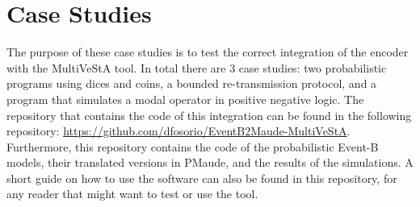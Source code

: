 \chapter{Case Studies}


The purpose of these case studies is to test the correct integration of the encoder with the MultiVeStA tool. In total there are 3 case studies: two probabilistic programs using dices and coins, a bounded re-transmission protocol, and a program that simulates a modal operator in positive negative logic. The repository that contains the code of this integration can be found in the following repository: \url{https://github.com/dfosorio/EventB2Maude-MultiVeStA}. Furthermore, this repository contains the code of the probabilistic Event-B models, their translated versions in PMaude, and the results of the simulations. A short guide on how to use the software can also be found in this repository, for any reader that might want to test or use the tool.



